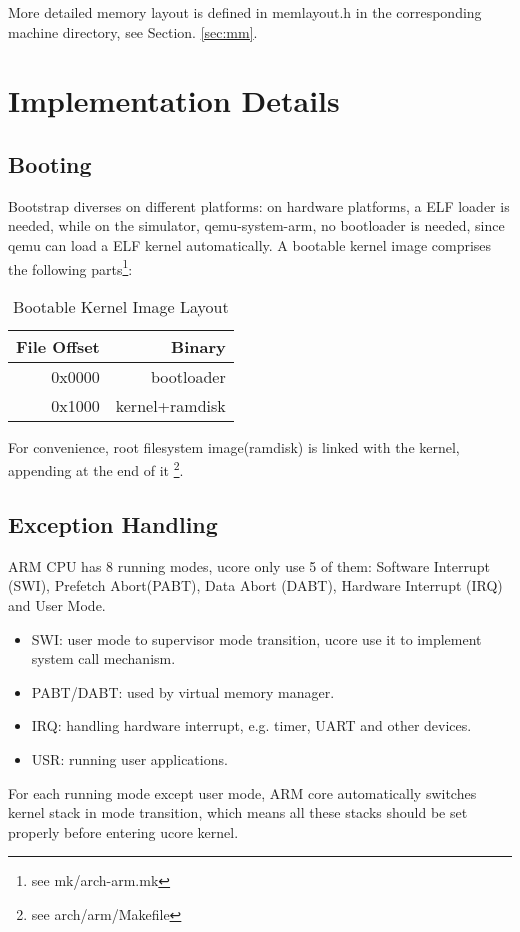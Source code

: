 \documentclass[a4paper]{article}
\begin{document}
More detailed memory layout is defined in memlayout.h in the corresponding
machine directory, see Section. \ref{sec:mm}.

\section{Implementation Details}
\subsection{Booting}
Bootstrap diverses on different platforms: on hardware platforms, a ELF
loader is needed, while on the simulator, qemu-system-arm, no bootloader
is needed, since qemu can load a ELF kernel automatically.
A bootable kernel image  comprises  the following parts\footnote{see mk/arch-arm.mk}:

\begin{table}[h]
  \centering
  \begin{tabular}{|r|r|}
    \hline
    File Offset & Binary \\
    \hline
    0x0000      & bootloader \\
    0x1000      & kernel+ramdisk     \\
    \hline
  \end{tabular}
  \caption{Bootable Kernel Image Layout}
  \label{tab:layout}
\end{table}
For convenience, root filesystem image(ramdisk) is linked
with the kernel, appending at the end of it
\footnote{see arch/arm/Makefile}.


\subsection{Exception Handling}
ARM CPU has 8 running modes, ucore only use 5 of them: Software Interrupt (SWI), Prefetch Abort(PABT), 
Data Abort (DABT), Hardware Interrupt (IRQ) and User Mode.
\begin{itemize}
  \item SWI: user mode to supervisor mode transition,
    ucore use it to implement system call mechanism.
  \item PABT/DABT: used by virtual memory manager.
  \item IRQ: handling hardware interrupt, e.g. timer,
    UART and other devices.
  \item USR: running user applications.
\end{itemize}
For each running mode except user mode, ARM core automatically switches kernel stack in mode transition, which means all these stacks should be set properly before entering ucore kernel.
\end{document}
